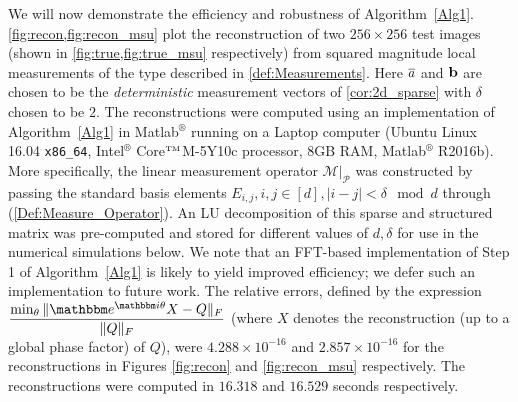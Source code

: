 We will now demonstrate the efficiency and robustness of Algorithm~\ref{Alg1}. \cref{fig:recon,fig:recon_msu} plot the reconstruction of two $256\times 256$ test images (shown in \cref{fig:true,fig:true_msu} respectively) from squared magnitude local measurements of the type described in \eqref{def:Measurements}.  Here $\overline{a}$ and $\mathbf b$ are chosen to be the {\em deterministic} measurement vectors of \cref{cor:2d_sparse} with $\delta$ chosen to be $2$.  The reconstructions were computed using an implementation of Algorithm~\ref{Alg1} in Matlab$^\circledR$ running on a Laptop computer (Ubuntu Linux 16.04 {\tt x86\_64}, Intel$^\circledR$ Core$^{\text{\tiny TM}}$M-5Y10c processor, 8GB RAM, Matlab$^\circledR$ R2016b).  More specifically, the linear measurement operator $\left. \mathcal M \right \vert_{\mathcal P}$ was constructed by passing the standard basis elements $E_{i,j}, i,j \in [d], |i-j|< \delta \mod d$ through (\ref{Def:Measure_Operator}).  An LU decomposition of this sparse and structured matrix was pre-computed and stored for different values of $d,\delta$ for use in the numerical simulations below.  We note that an FFT-based implementation of Step 1 of Algorithm~\ref{Alg1} is likely to yield improved efficiency; we defer such an implementation to future work.  The relative errors, defined by the expression $\displaystyle \frac{\min_\theta\Vert \mathbbm e^{\mathbbm i \theta} X-Q\Vert_F}{\Vert Q\Vert_F}$ (where $X$ denotes the reconstruction (up to a global phase factor) of $Q$), were $4.288\times 10^{-16}$ and $2.857\times 10^{-16}$ for the reconstructions in Figures \ref{fig:recon} and \ref{fig:recon_msu} respectively.  The reconstructions were computed in $16.318$ and $16.529$ seconds respectively.
%

